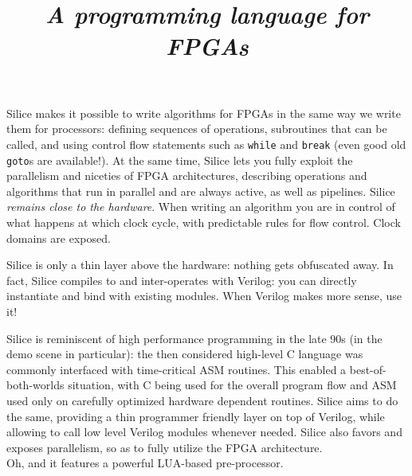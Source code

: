 \documentclass[a4]{article}
\title{\silice{}\\ \textit{\normalsize A programming language for FPGAs}}
\newcommand\verilog{Verilog}
\newcommand\silice{Silice}
\begin{document}
\maketitle

\silice{} makes it possible to write algorithms for FPGAs in the same way we write them for processors: defining sequences of operations, subroutines that can be called, and using control flow statements such as \texttt{while} and \texttt{break} (even good old \texttt{goto}s are available!). 
At the same time, \silice{} lets you fully exploit the parallelism and niceties of FPGA architectures, describing operations and algorithms that run in parallel and are always active, as well as pipelines.
\silice{} \textit{remains close to the hardware}. When writing an algorithm you are in control of what happens at which clock cycle, with predictable rules for flow control. Clock domains are exposed. 

\silice{} is only a thin layer above the hardware: nothing gets obfuscated away. In fact, \silice{} compiles to and inter-operates with \verilog{}: you can directly instantiate and bind with existing modules. When \verilog{} makes more sense, use it!

\silice{} is reminiscent of high performance programming in the late 90s (in the demo scene in particular): the then considered high-level C language was commonly interfaced with time-critical ASM routines. This enabled a best-of-both-worlds situation, with C being used for the overall program flow and ASM used only on carefully optimized hardware dependent routines.
%
\silice{} aims to do the same, providing a thin programmer friendly layer on top of \verilog{}, while allowing to call low level \verilog{} modules whenever needed.
\silice{} also favors and exposes parallelism, so as to fully utilize the FPGA architecture.\\

Oh, and it features a powerful LUA-based pre-processor.\\

\end{document}

